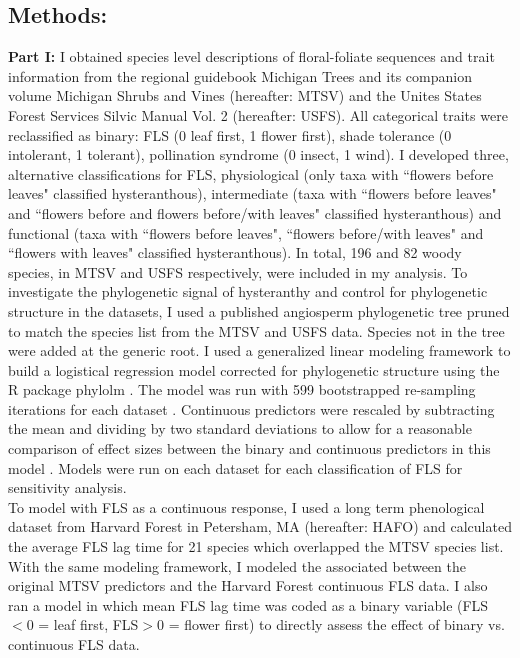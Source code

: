 \documentclass[12pt]{article}\usepackage[]{graphicx}\usepackage[]{color}
\begin{document}
\subsection*{Methods:}
\indent\indent\textbf{Part I:} I obtained species level descriptions of floral-foliate sequences and trait information from the regional guidebook Michigan Trees \citep{Barnes2004} and its companion volume Michigan Shrubs and Vines \citep{Barnes2016} (hereafter: MTSV) and the Unites States Forest Services Silvic Manual Vol. 2 \citep{Burns1990} (hereafter: USFS). All categorical traits were reclassified as binary: FLS (0 leaf first, 1 flower first), shade tolerance (0 intolerant, 1 tolerant), pollination syndrome (0 insect, 1 wind). I developed three, alternative classifications for FLS, physiological (only taxa with ``flowers before leaves" classified hysteranthous), intermediate (taxa with ``flowers before leaves" and ``flowers before and flowers before/with leaves" classified hysteranthous) and functional (taxa with ``flowers before leaves", ``flowers before/with leaves" and ``flowers with leaves" classified hysteranthous). In total, 196 and 82 woody species, in MTSV and USFS respectively, were included in my analysis. To investigate the phylogenetic signal of hysteranthy and control for phylogenetic structure in the datasets, I used a published angiosperm phylogenetic tree \citep{Zanne2013} pruned to match the species list from the MTSV and USFS data. Species not in the tree were added at the generic root. I used  a generalized linear modeling framework \citep{Ives2010} to build a logistical regression model corrected for phylogenetic structure using the R package phylolm \citep{Ho2014}. The model was run with 599 bootstrapped re-sampling iterations for each dataset \citep{Wilcox2010}. Continuous predictors were rescaled by subtracting the mean and dividing by two standard deviations to allow for a reasonable comparison of effect sizes between the binary and continuous predictors in this model \citep{Gelman2007}. Models were run on each dataset for each classification of FLS for sensitivity analysis.\\ 
\indent To model with FLS as a continuous response, I used a long term phenological dataset from Harvard Forest in Petersham, MA \citep{Okeefe2015} (hereafter: HAFO)  and calculated the average FLS lag time for 21 species which overlapped the MTSV species list. With the same modeling framework, I modeled the associated between the original MTSV predictors and the Harvard Forest continuous FLS data. I also ran a model in which mean FLS lag time was coded as a binary variable (FLS$<0$ = leaf first, FLS$>0$ = flower first) to directly assess the effect of binary vs. continuous FLS data.\\
\end{document}
